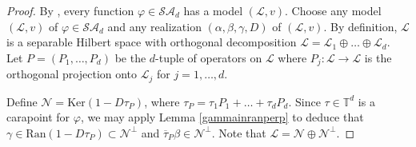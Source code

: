 \documentclass[11pt, reqno]{amsart}
\newcommand\1{\boldsymbol {1}}
\numberwithin{equation}{section}
\begin{document}
\begin{proof}
By \cite[Theorem 9.102]{AMYOperatorbook}, every function $\varphi\in\mathcal{SA}_{d}$ has a model $(\mathcal{L},v)$. Choose any model $(\mathcal{L},v)$ of $\varphi\in\mathcal{SA}_{d}$ and any realization $(\alpha,\beta, \gamma, D)$ of $(\mathcal{L},v)$. By definition, $\mathcal{L}$ is a separable Hilbert space with orthogonal decomposition $\mathcal{L} = \mathcal{L}_{1}\oplus \hdots \oplus \mathcal{L}_{d}$. Let $P=(P_{1},\hdots, P_{d})$ be the $d$-tuple of operators on $\mathcal{L}$ where $P_{j}:\mathcal{L}\rightarrow \mathcal{L}$ is the orthogonal projection onto $\mathcal{L}_{j}$ for $j=1,\hdots,d$. 

Define $\mathcal{N}=\mathrm{Ker}(1-D\tau_{P})$, where $\tau_{P}=\tau_{1}P_{1}+\hdots+\tau_{d}P_{d}$. Since $\tau\in\mathbb{T}^{d}$ is a carapoint for $\varphi$, we may apply Lemma \ref{gammainranperp} to deduce that $\gamma\in\mathrm{Ran}(1-D\tau_P)\subset \mathcal{N}^{\perp}$ and $\overline{\tau}_{P}\beta\in\mathcal{N}^{\perp}$. Note that $\mathcal{L}=\mathcal{N}\oplus \mathcal{N}^{\perp}$.


\end{proof}
\end{document}
